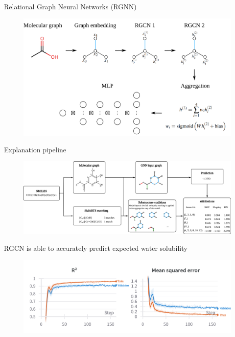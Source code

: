 \documentclass[aspectratio=169]{beamer}
\begin{document}
\begin{frame}{Relational Graph Neural Networks (RGNN)}

    \begin{figure}[h]
        \centering
        \includegraphics[scale=0.75]{../thesis/Fig/rgcn_model.png}
    \end{figure}
   
\end{frame}


\begin{frame}{Explanation pipeline}

    \begin{figure}[h]
        \centering
        \includegraphics[scale=0.44]{./img/pipeline.png}
    \end{figure}

\end{frame}


\begin{frame}{RGCN is able to accurately predict expected water solubility}

    \begin{figure}[h]
        \centering
        \includegraphics[scale=0.45]{./img/rgcn_performance.png}
    \end{figure}
   
\end{frame}
\end{document}
